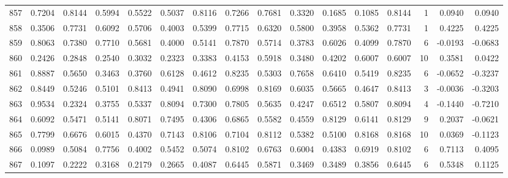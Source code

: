 \begin{tabular}{lrrrrrrrrrrrrrrr}
857 &      0.7204 &  0.8144 &  0.5994 &  0.5522 &  0.5037 &  0.8116 &  0.7266 &  0.7681 &  0.3320 &  0.1685 &   0.1085 &     0.8144 &      1 &                    0.0940 &                     0.0940 \\
858 &      0.3506 &  0.7731 &  0.6092 &  0.5706 &  0.4003 &  0.5399 &  0.7715 &  0.6320 &  0.5800 &  0.3958 &   0.5362 &     0.7731 &      1 &                    0.4225 &                     0.4225 \\
859 &      0.8063 &  0.7380 &  0.7710 &  0.5681 &  0.4000 &  0.5141 &  0.7870 &  0.5714 &  0.3783 &  0.6026 &   0.4099 &     0.7870 &      6 &                   -0.0193 &                    -0.0683 \\
860 &      0.2426 &  0.2848 &  0.2540 &  0.3032 &  0.2323 &  0.3383 &  0.4153 &  0.5918 &  0.3480 &  0.4202 &   0.6007 &     0.6007 &     10 &                    0.3581 &                     0.0422 \\
861 &      0.8887 &  0.5650 &  0.3463 &  0.3760 &  0.6128 &  0.4612 &  0.8235 &  0.5303 &  0.7658 &  0.6410 &   0.5419 &     0.8235 &      6 &                   -0.0652 &                    -0.3237 \\
862 &      0.8449 &  0.5246 &  0.5101 &  0.8413 &  0.4941 &  0.8090 &  0.6998 &  0.8169 &  0.6035 &  0.5665 &   0.4647 &     0.8413 &      3 &                   -0.0036 &                    -0.3203 \\
863 &      0.9534 &  0.2324 &  0.3755 &  0.5337 &  0.8094 &  0.7300 &  0.7805 &  0.5635 &  0.4247 &  0.6512 &   0.5807 &     0.8094 &      4 &                   -0.1440 &                    -0.7210 \\
864 &      0.6092 &  0.5471 &  0.5141 &  0.8071 &  0.7495 &  0.4306 &  0.6865 &  0.5582 &  0.4559 &  0.8129 &   0.6141 &     0.8129 &      9 &                    0.2037 &                    -0.0621 \\
865 &      0.7799 &  0.6676 &  0.6015 &  0.4370 &  0.7143 &  0.8106 &  0.7104 &  0.8112 &  0.5382 &  0.5100 &   0.8168 &     0.8168 &     10 &                    0.0369 &                    -0.1123 \\
866 &      0.0989 &  0.5084 &  0.7756 &  0.4002 &  0.5452 &  0.5074 &  0.8102 &  0.6763 &  0.6004 &  0.4383 &   0.6919 &     0.8102 &      6 &                    0.7113 &                     0.4095 \\
867 &      0.1097 &  0.2222 &  0.3168 &  0.2179 &  0.2665 &  0.4087 &  0.6445 &  0.5871 &  0.3469 &  0.3489 &   0.3856 &     0.6445 &      6 &                    0.5348 &                     0.1125 \\

\end{tabular}
